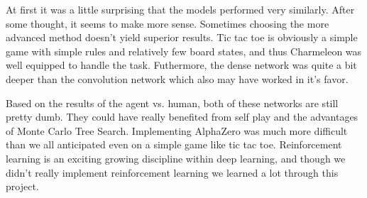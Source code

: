 At first it was a little surprising that the models performed very similarly. After some thought, it seems to make more sense. Sometimes choosing the more advanced method doesn't yield superior results. Tic tac toe is obviously a simple game with simple rules and relatively few board states, and thus Charmeleon was well equipped to handle the task. Futhermore, the dense network was quite a bit deeper than the convolution network which also may have worked in it's favor.  

Based on the results of the agent vs. human, both of these networks are still pretty dumb. They could have really benefited from self play and the advantages of Monte Carlo Tree Search. Implementing AlphaZero was much more difficult than we all anticipated even on a simple game like tic tac toe.  Reinforcement learning is an exciting growing discipline within deep learning, and though we didn't really implement reinforcement learning we learned a lot through this project. 